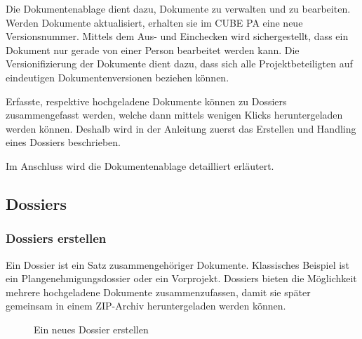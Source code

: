 \vspace{\baselineskip}

Die Dokumentenablage dient dazu, Dokumente zu verwalten und zu bearbeiten. Werden Dokumente aktualisiert, erhalten sie im CUBE PA eine neue Versionsnummer. Mittels dem Aus- und Einchecken wird sichergestellt, dass ein Dokument nur gerade von einer Person bearbeitet werden kann. Die Versionifizierung der Dokumente dient dazu, dass sich alle Projektbeteiligten auf eindeutigen Dokumentenversionen beziehen können. 

\vspace{2cm}  

Erfasste, respektive hochgeladene Dokumente können zu Dossiers zusammengefasst werden, welche dann mittels wenigen Klicks heruntergeladen werden können. Deshalb wird in der Anleitung zuerst das Erstellen und Handling eines Dossiers beschrieben.

\vspace{\baselineskip}

Im Anschluss wird die Dokumentenablage detailliert erläutert.

\subsection{Dossiers}
\label{bkm:Ref442544219}
\subsubsection{Dossiers erstellen}

Ein Dossier ist ein Satz zusammengehöriger Dokumente. Klassisches Beispiel ist ein Plangenehmigungsdossier oder ein Vorprojekt. Dossiers bieten die Möglichkeit mehrere hochgeladene Dokumente zusammenzufassen, damit sie später gemeinsam in einem ZIP-Archiv heruntergeladen werden können.

\begin{figure}[H]
\caption{Ein neues Dossier erstellen}
\end{figure}

